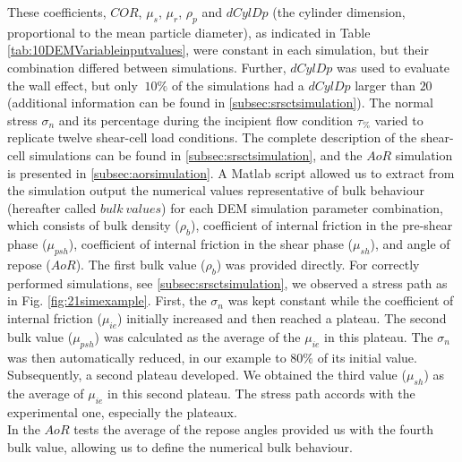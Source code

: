 \documentclass[review]{elsarticle}
\begin{document}
These coefficients, $COR$, $\mu_s$, $\mu_r$,
$\rho_p$ and $dCylDp$ (the cylinder dimension, proportional to the mean
particle diameter), as indicated in Table \ref{tab:10DEMVariableinputvalues}, 
were constant in each simulation, but their combination differed between
simulations.
Further, $dCylDp$ was used to evaluate the wall effect, but only $~10\%$ of the
simulations had a $dCylDp$ larger than $20$ (additional information can be found
in \ref{subsec:srsctsimulation}).
The normal stress $\sigma_n$ and its
percentage during the incipient flow condition $\tau_{\%}$
varied to replicate twelve shear-cell load conditions. 
The complete description of the shear-cell simulations can be found in \ref{subsec:srsctsimulation}, 
and the $AoR$ simulation is presented in \ref{subsec:aorsimulation}.
A Matlab script allowed us to extract from the simulation output the numerical
values representative of bulk behaviour (hereafter called $bulk ~ values$)
for each DEM simulation parameter combination, which consists of
bulk density ($\rho_b$),
coefficient of internal friction in the pre-shear phase ($\mu_{psh}$),
coefficient of internal friction in the shear phase ($\mu_{sh}$),
and angle of repose ($AoR$).
The first bulk value ($\rho_b$) was provided directly. 
For correctly performed simulations, see \ref{subsec:srsctsimulation}, we
observed a stress path as in Fig. \ref{fig:21simexample}.
First, the $\sigma_n$ was kept constant while the coefficient of internal
friction ($\mu_{ie}$) initially increased and then reached a plateau.
The second bulk value ($\mu_{psh}$) was calculated as the average of the
$\mu_{ie}$ in this plateau.
The $\sigma_n$ was then automatically reduced, in our example to $80 \%$ of
its initial value.
Subsequently, a second plateau developed.
We obtained the third
value ($\mu_{sh}$) as the average of $\mu_{ie}$ in this second plateau.
The stress path accords with the experimental one, especially the plateaux.\\
In the $AoR$ tests the average of the repose angles provided us with the fourth
bulk value, allowing us to define the numerical bulk behaviour.
\end{document}
